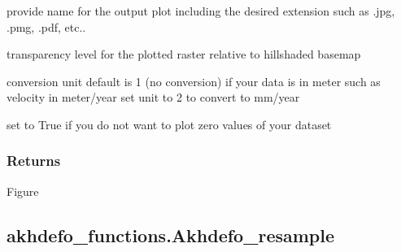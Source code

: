 \documentclass[letterpaper,10pt]{sphinxmanual}
\begin{document}
\begin{fulllineitems}
\begin{description}
\sphinxAtStartPar
provide name for the output plot including the desired extension such as .jpg, .pmg, .pdf, etc..

\sphinxAtStartPar
transparency level for the plotted raster relative to hillshaded basemap

\sphinxAtStartPar
conversion unit default is 1 (no conversion) if your data is in meter such as velocity in meter/year set unit to 2 to convert to mm/year

\sphinxAtStartPar
set to True if you do not want to plot zero values of your dataset

\end{description}


\subsubsection{Returns}
\label{\detokenize{generated/akhdefo_functions.akhdefo_viewer:returns}}
\sphinxAtStartPar
Figure

\end{fulllineitems}


\sphinxstepscope


\subsection{akhdefo\_functions.Akhdefo\_resample}
\label{\detokenize{generated/akhdefo_functions.Akhdefo_resample:akhdefo-functions-akhdefo-resample}}\label{\detokenize{generated/akhdefo_functions.Akhdefo_resample::doc}}
\end{document}
